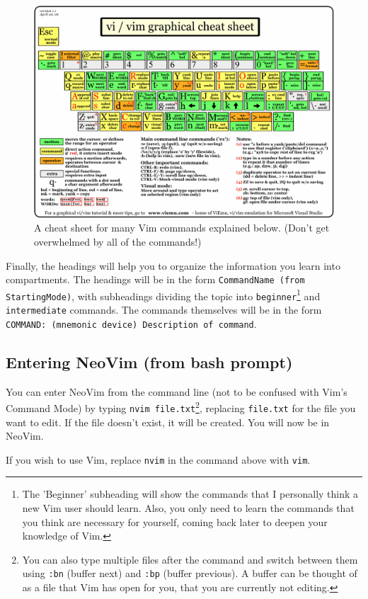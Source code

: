 \documentclass[11pt]{article}
\begin{document}
\begin{figure}[htbp]
\centering
\includegraphics[width=.9\linewidth]{./vi-vim-cheat-sheet.png}
\caption{\label{fig:orgeaf0f98}
A cheat sheet for many Vim commands explained below. (Don't get overwhelmed by all of the commands!)}
\end{figure}

Finally, the headings will help you to organize the information you learn into
compartments. The headings will be in the form \texttt{CommandName (from StartingMode)},
with subheadings dividing the topic into \texttt{beginner}\footnote{The 'Beginner' subheading will show the commands that I personally
think a new Vim user should learn. Also, you only need to learn the commands
that you think are necessary for yourself, coming back later to deepen your
knowledge of Vim.} and \texttt{intermediate} commands.
The commands themselves will be in the form \texttt{COMMAND: (mnemonic device)
Description of command}.
\subsection{Entering NeoVim (from bash prompt)}
\label{sec:org3e2fa4c}
You can enter NeoVim from the command line (not to be confused with Vim's
Command Mode) by typing \texttt{nvim file.txt}\footnote{You can also type multiple files after the command and switch
between them using \texttt{:bn} (buffer next) and \texttt{:bp} (buffer previous). A buffer can
be thought of as a file that Vim has open for you, that you are currently not
editing.}, replacing \texttt{file.txt} for the file you
want to edit. If the file doesn't exist, it will be created. You will now be in
NeoVim.

If you wish to use Vim, replace \texttt{nvim} in the command above with \texttt{vim}.
\end{document}
